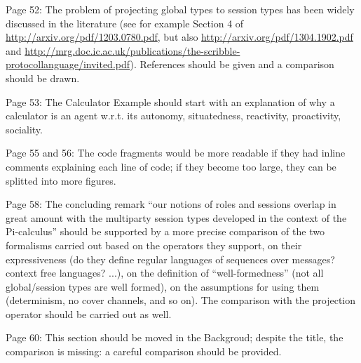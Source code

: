 \documentclass{article}
\newcommand{\todo}[1]{[\textcolor{red}{TODO}: #1]}
\newenvironment{them}{\noindent\begingroup\color{blue}}{\endgroup\par}
\begin{document}
\begin{them}

Page 52:
The problem of projecting global types to session types has been widely
discussed in the literature (see for example Section 4 of
\url{http://arxiv.org/pdf/1203.0780.pdf}, but also
\url{http://arxiv.org/pdf/1304.1902.pdf} and
\url{http://mrg.doc.ic.ac.uk/publications/the-scribble-protocollanguage/invited.pdf}).
References should be given and a comparison should be drawn.

\end{them}
\todo{?}

\begin{them}

Page 53:
The Calculator Example should start with an explanation of why a calculator is
an agent w.r.t. its autonomy, situatedness, reactivity, proactivity, sociality.

\end{them}
\todo{}

\begin{them}

Page 55 and 56:
The code fragments would be more readable if they had inline comments
explaining each line of code; if they become too large, they can be splitted
into more figures.

\end{them}
\todo{}

\begin{them}

Page 58:
The concluding remark “our notions of roles and sessions overlap in great
amount with the multiparty session types developed in the context of the
Pi-calculus” should be supported by a more precise comparison of the two
formalisms carried out based on the operators they support, on their
expressiveness (do they define regular languages of sequences over messages?
context free languages? ...), on the definition of “well-formedness” (not all
global/session types are well formed), on the assumptions for using them
(determinism, no cover channels, and so on). The comparison with the projection
operator should be carried out as well.

\end{them}
\todo{}

\begin{them}

Page 60:
This section should be moved in the Backgroud; despite the title, the
comparison is missing: a careful comparison should be provided.

\end{them}
\todo{}
\end{document}
